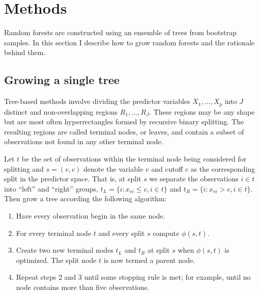 \section{Methods}

Random forests are constructed using an ensemble of trees from bootstrap samples. In this section I describe how to grow random forests and the rationale behind them.

\subsection{Growing a single tree}

Tree-based methods involve dividing the predictor variables $X_1,\ldots,X_p$ into $J$ distinct and non-overlapping regions $R_1,\ldots,R_J$. These regions may be any shape but are most often hyperrectangles formed by recursive binary splitting. The resulting regions are called terminal nodes, or leaves, and contain a subset of observations not found in any other terminal node.

Let $t$ be the set of observations within the terminal node being considered for splitting and $s=(v, c)$ denote the variable $v$ and cutoff $c$ as the corresponding split in the predictor space. That is, at split $s$ we separate the observations $i\in t$ into ``left'' and ``right'' groups, $t_L=\{i:x_{vi}\leq c, i\in t\}$ and $t_R=\{i:x_{vi} > c, i\in t\}$. Then grow a tree according the following algorithm:

\begin{enumerate}
\item Have every observation begin in the same node.
\item For every terminal node $t$ and every split $s$ compute $\phi(s, t)$.
\item Create two new terminal nodes $t_L$ and $t_R$ at split $s$ when $\phi(s, t)$ is optimized. The split node $t$ is now termed a parent node.
\item Repeat steps 2 and 3 until some stopping rule is met; for example, until no node contains more than five observations.
\end{enumerate}

